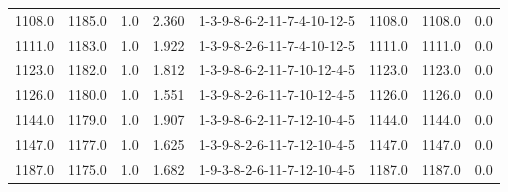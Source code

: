 \begin{tabular}{rrrrlrrr}
 1108.0 &  1185.0 &            1.0 &              2.360 &  1-3-9-8-6-2-11-7-4-10-12-5 &        1108.0 &          1108.0 &       0.0 \\
 1111.0 &  1183.0 &            1.0 &              1.922 &  1-3-9-8-2-6-11-7-4-10-12-5 &        1111.0 &          1111.0 &       0.0 \\
 1123.0 &  1182.0 &            1.0 &              1.812 &  1-3-9-8-6-2-11-7-10-12-4-5 &        1123.0 &          1123.0 &       0.0 \\
 1126.0 &  1180.0 &            1.0 &              1.551 &  1-3-9-8-2-6-11-7-10-12-4-5 &        1126.0 &          1126.0 &       0.0 \\
 1144.0 &  1179.0 &            1.0 &              1.907 &  1-3-9-8-6-2-11-7-12-10-4-5 &        1144.0 &          1144.0 &       0.0 \\
 1147.0 &  1177.0 &            1.0 &              1.625 &  1-3-9-8-2-6-11-7-12-10-4-5 &        1147.0 &          1147.0 &       0.0 \\
 1187.0 &  1175.0 &            1.0 &              1.682 &  1-9-3-8-2-6-11-7-12-10-4-5 &        1187.0 &          1187.0 &       0.0 \\
\bottomrule
\end{tabular}
